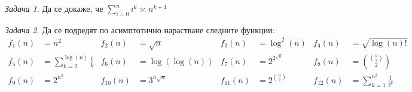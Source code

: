 \documentclass{article}
\theoremstyle{definition}
\theoremstyle{plain}
\theoremstyle{remark}
\newtheorem{problem}{Задача}
\theoremstyle{definition}
\begin{document}
\begin{problem}
Да се докаже, че $\sum\limits_{i = 0}^n i^k \asymp n^{k+1}$
\end{problem}

\begin{problem}
Да се подредят по асимптотично нарастване следните функции:
\begin{align*}
  f_1(n) & = n^2                                       & f_2(n)    & = \sqrt{n}       & f_3(n)    & = \log^2(n)        & f_4(n)    & = \sqrt{\log(n)!}                         \\
  f_5(n) & = \sum\limits_{k = 2}^{\log(n)} \frac{1}{k} & f_6(n)    & = \log(\log(n))  & f_7(n)    & = 2^{2^{\sqrt{n}}} & f_8(n)    & = \binom{\binom{n}{3}}{2}                 \\
  f_9(n) & =2^{n^2}                                    & f_{10}(n) & = 3^{n \sqrt{n}} & f_{11}(n) & =2^{\binom{n}{2}}  & f_{12}(n) & = \sum\limits_{k = 1}^{n^2} \frac{1}{2^k}
\end{align*}
\end{problem}
\end{document}
